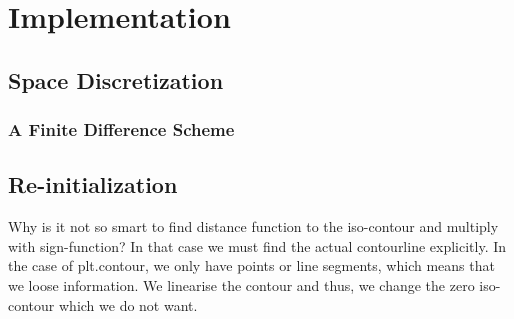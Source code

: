 \chapter{Implementation}

\section{Space Discretization}
\subsection{A Finite Difference Scheme}


\section{Re-initialization}

Why is it not so smart to find distance function to the iso-contour and multiply with sign-function?
In that case we must find the actual contourline explicitly. In the case of plt.contour, we only have 
points or line segments, which means that we loose information. We linearise the contour and thus, we change the zero iso-contour which we do not want.